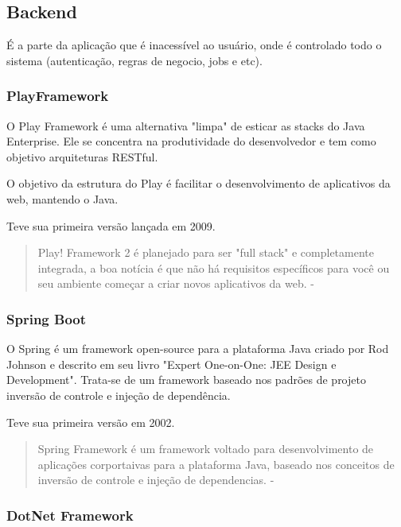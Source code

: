 \subsection{Backend}

É a parte da aplicação que é inacessível ao usuário, onde é controlado todo o sistema (autenticação, regras de negocio, jobs e etc).

\subsubsection{PlayFramework}

O Play Framework é uma alternativa "limpa" de esticar as stacks do Java Enterprise. Ele se concentra na produtividade do desenvolvedor e tem como objetivo arquiteturas RESTful. 

O objetivo da estrutura do Play é facilitar o desenvolvimento de aplicativos da web, mantendo o Java.

Teve sua primeira versão lançada em 2009.

\begin{quote}
Play! Framework 2 é planejado para ser "full stack" e completamente integrada, a boa notícia é que não há requisitos específicos para você ou seu ambiente começar a criar novos aplicativos da web. - \cite{petrella2013learning}
\end{quote}

\subsubsection{Spring Boot}

O Spring é um framework open-source para a plataforma Java criado por Rod Johnson e descrito em seu livro "Expert One-on-One: JEE Design e Development".
Trata-se de um framework baseado nos padrões de projeto inversão de controle e injeção de dependência.

Teve sua primeira versão em 2002.

\begin{quote}
  Spring Framework é um framework voltado para desenvolvimento de aplicações corportaivas para a plataforma Java, baseado nos conceitos de inversão de controle e injeção de dependencias. - \cite{weissmann2014vire}
\end{quote}

\subsubsection{DotNet Framework}

